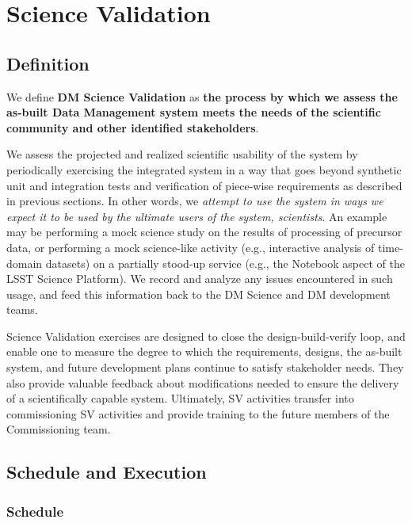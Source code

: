 \section{Science Validation} \label{sect:scival}

\subsection{Definition}

We define  {\bf DM Science Validation} as {\bf the process by which we
assess the as-built Data Management system meets the needs of the
scientific community and other identified stakeholders}.

We assess the projected and realized scientific usability of the system by
periodically exercising the integrated system in a way that goes beyond
synthetic unit and integration tests and verification of piece-wise
requirements as described in previous sections.  In other words, we {\em
attempt to use the system in ways we expect it to be used by the ultimate
users of the system, scientists}.  An example may be performing a mock
science study on the results of processing of precursor data, or performing
a mock science-like activity (e.g., interactive analysis of time-domain
datasets) on a partially stood-up service (e.g., the Notebook aspect of the
LSST Science Platform).  We record and analyze any issues encountered in
such usage, and feed this information back to the DM Science and DM
development teams.

Science Validation exercises are designed to close the design-build-verify
loop, and enable one to measure the degree to which the requirements,
designs, the as-built system, and future development plans continue to
satisfy stakeholder needs.  They also provide valuable feedback about
modifications needed to ensure the delivery of a scientifically capable
system.  Ultimately, SV activities transfer into commissioning SV activities
and provide training to the future members of the Commissioning team.


\subsection{Schedule and Execution}

\subsubsection{Schedule}

